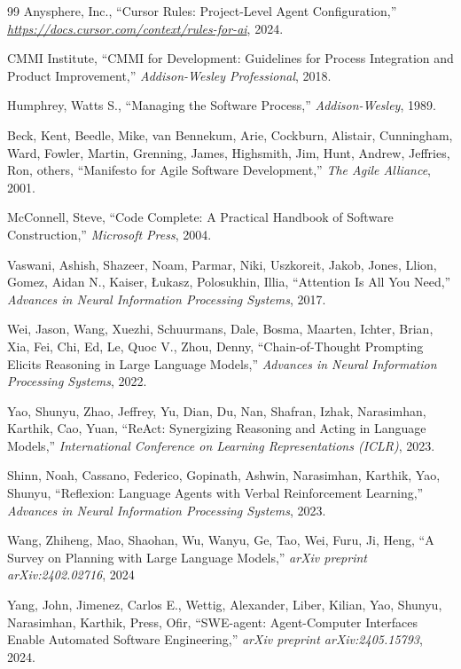 \documentclass[letterpaper, 10 pt, conference]{ieeeconf}
\begin{document}
\begin{thebibliography}{99}
{Anysphere, Inc.}, ``Cursor Rules: Project-Level Agent Configuration,'' \emph{\url{https://docs.cursor.com/context/rules-for-ai}}, 2024.

{CMMI Institute}, ``{CMMI} for Development: Guidelines for Process Integration and Product Improvement,'' \emph{Addison-Wesley Professional}, 2018.

Humphrey, Watts S., ``Managing the Software Process,'' \emph{Addison-Wesley}, 1989.

Beck, Kent, Beedle, Mike, van Bennekum, Arie, Cockburn, Alistair, Cunningham, Ward, Fowler, Martin, Grenning, James, Highsmith, Jim, Hunt, Andrew, Jeffries, Ron, others, ``Manifesto for Agile Software Development,'' \emph{The Agile Alliance}, 2001.

McConnell, Steve, ``Code Complete: A Practical Handbook of Software Construction,'' \emph{{Microsoft Press}}, 2004.

Vaswani, Ashish, Shazeer, Noam, Parmar, Niki, Uszkoreit, Jakob, Jones, Llion, Gomez, Aidan N., Kaiser, {\L}ukasz, Polosukhin, Illia, ``Attention Is All You Need,'' \emph{Advances in Neural Information Processing Systems}, 2017.

Wei, Jason, Wang, Xuezhi, Schuurmans, Dale, Bosma, Maarten, Ichter, Brian, Xia, Fei, Chi, Ed, Le, Quoc V., Zhou, Denny, ``Chain-of-Thought Prompting Elicits Reasoning in Large Language Models,'' \emph{Advances in Neural Information Processing Systems}, 2022.

Yao, Shunyu, Zhao, Jeffrey, Yu, Dian, Du, Nan, Shafran, Izhak, Narasimhan, Karthik, Cao, Yuan, ``{ReAct}: Synergizing Reasoning and Acting in Language Models,'' \emph{International Conference on Learning Representations (ICLR)}, 2023.

Shinn, Noah, Cassano, Federico, Gopinath, Ashwin, Narasimhan, Karthik, Yao, Shunyu, ``Reflexion: Language Agents with Verbal Reinforcement Learning,'' \emph{Advances in Neural Information Processing Systems}, 2023.

Wang, Zhiheng, Mao, Shaohan, Wu, Wanyu, Ge, Tao, Wei, Furu, Ji, Heng, ``A Survey on Planning with Large Language Models,'' \emph{arXiv preprint arXiv:2402.02716}, {2024}

Yang, John, Jimenez, Carlos E., Wettig, Alexander, Liber, Kilian, Yao, Shunyu, Narasimhan, Karthik, Press, Ofir, ``{SWE}-agent: Agent-Computer Interfaces Enable Automated Software Engineering,'' \emph{arXiv preprint arXiv:2405.15793}, 2024.


\end{thebibliography}
\end{document}
